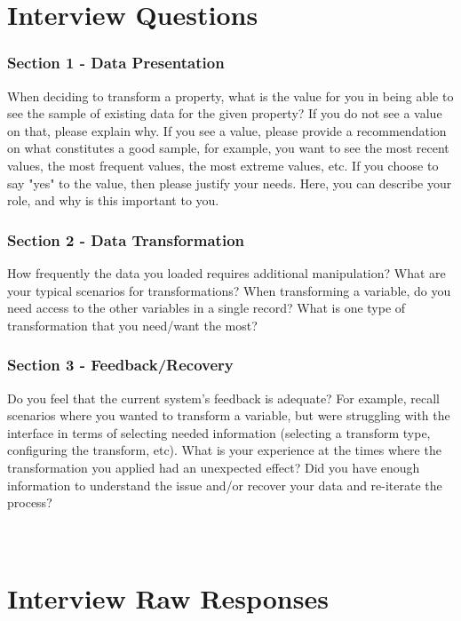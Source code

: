\documentclass[12pt,letterpaper]{article}
\begin{document}
 


\appendix

\section{Interview Questions}

\subsubsection*{Section 1 - Data Presentation}
When deciding to transform a property, what is the value for you in being able to see the sample of existing data for the given property? If you do not see a value on that, please explain why.  If you see a value, please provide a recommendation on what constitutes a good sample, for example, you want to see the most recent values, the most frequent values, the most extreme values, etc. If you choose to say "yes" to the value, then please justify your needs. Here, you can describe your role, and why is this important to you.  

\subsubsection*{Section 2 - Data Transformation}
How frequently the data you loaded requires additional manipulation? What are your typical scenarios for transformations? When transforming a variable, do you need access to the other variables in a single record? What is one type of transformation that you need/want the most?  

\subsubsection*{Section 3 - Feedback/Recovery}
Do you feel that the current system's feedback is adequate? For example, recall scenarios where you wanted to transform a variable, but were struggling with the interface in terms of selecting needed information (selecting a transform type, configuring the transform, etc). What is your experience at the times where the transformation you applied had an unexpected effect? Did you have enough information to understand the issue and/or recover your data and re-iterate the process?

\section{\\Interview Raw Responses}
\end{document}
